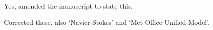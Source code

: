 \documentclass{article}
\begin{document}
\begin{quotation}
	\begin{comment}
	\item Line 449: Do you refer to the normalized $\ell_2$ error here?
	\end{comment}
\end{quotation}
Yes, amended the manuscript to state this.
\begin{quotation}
	\begin{comment}
	\item Check the references for some phrases that need to be capitalized, as e.g. Appalachian in line 571 or Lagrangian in line 567 
	\end{comment}
\end{quotation}
Corrected these, also `Navier-Stokes' and `Met Office Unified Model'.



\end{document}
